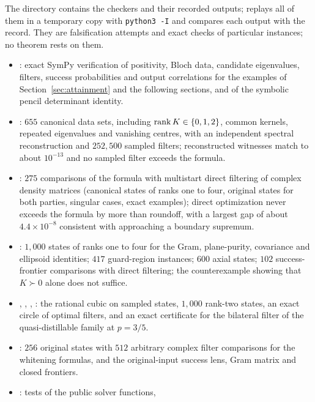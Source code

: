The directory  contains the checkers and their
recorded outputs;  replays all of them in a
temporary copy with \texttt{python3 -I} and compares each output with the
record. They are falsification attempts and exact checks of particular
instances; no theorem rests on them.

\begin{itemize}[leftmargin=1.5em]
\item {}: exact SymPy verification of positivity,
Bloch data, candidate eigenvalues, filters, success probabilities and output
correlations for the examples of Section~\ref{sec:attainment} and the
following sections, and of the symbolic pencil determinant identity.
\item {}: $655$ canonical data sets, including
$\operatorname{rank} K\in\{0,1,2\}$, common kernels, repeated eigenvalues and vanishing
centres, with an independent spectral reconstruction and $252{,}500$ sampled
filters; reconstructed witnesses match to about $10^{-13}$ and no sampled
filter exceeds the formula.
\item {}: $275$ comparisons of the
formula with multistart direct filtering of complex density matrices
(canonical states of ranks one to four, original states for both parties,
singular cases, exact examples); direct optimization never exceeds the
formula by more than roundoff, with a largest gap of about
$4.4\times10^{-8}$ consistent with approaching a boundary supremum.
\item {}: $1{,}000$ states of ranks
one to four for the Gram, plane-purity, covariance and ellipsoid identities;
$417$ guard-region instances; $600$ axial states; $102$ success-frontier
comparisons with direct filtering; the counterexample showing that $K\succ0$
alone does not suffice.
\item {},
, ,
: the rational cubic on sampled
states, $1{,}000$ rank-two states, an exact circle of optimal filters, and
an exact certificate for the bilateral filter of the quasi-distillable
family at $p=3/5$.
\item {}: $256$ original states with $512$ arbitrary
complex filter comparisons for the whitening formulas, and the
original-input success lens, Gram matrix and closed frontiers.
\item {}: tests of the public solver functions,

\end{itemize}
